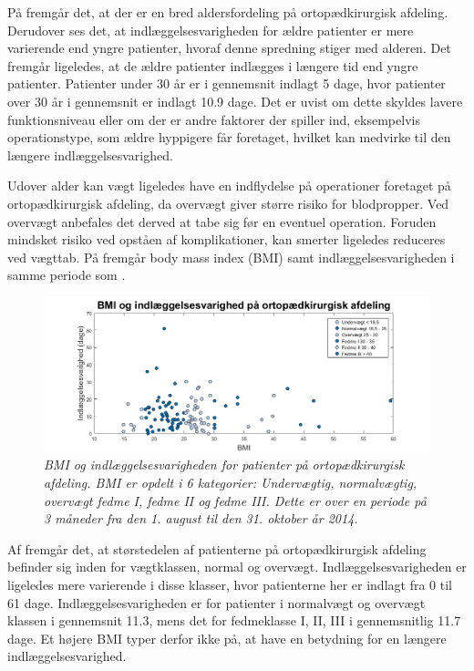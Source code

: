 \noindent
På  fremgår det, at der er en bred aldersfordeling på ortopædkirurgisk afdeling. Derudover ses det, at indlæggelsesvarigheden for ældre patienter er mere varierende end yngre patienter, hvoraf denne spredning stiger med alderen. Det fremgår ligeledes, at de ældre patienter indlægges i længere tid end yngre patienter. Patienter under $30$ år er i gennemsnit indlagt 5 dage, hvor patienter over $30$ år i gennemsnit er indlagt 10.9 dage. Det er uvist om dette skyldes lavere funktionsniveau eller om der er andre faktorer der spiller ind, eksempelvis operationstype, som ældre hyppigere får foretaget, hvilket kan medvirke til den længere indlæggelsesvarighed.


Udover alder kan vægt ligeledes have en indflydelse på operationer foretaget på ortopædkirurgisk afdeling, da overvægt giver større risiko for blodpropper\cite{Ermonds2004}. Ved overvægt anbefales det derved at tabe sig før en eventuel operation. Foruden mindsket risiko ved opståen af komplikationer, kan smerter ligeledes reduceres ved vægttab.\cite{Nordjylland2014} På  fremgår body mass index (BMI) samt indlæggelsesvarigheden i samme periode som .

\begin{figure}[H]
	\centering
	\includegraphics[scale=0.6]{figures/BMIogindlaeg}
	\caption{\textit{BMI og indlæggelsesvarigheden for patienter på ortopædkirurgisk afdeling. BMI er opdelt i 6 kategorier: Undervægtig, normalvægtig, overvægt fedme I, fedme II og fedme III. Dette er over en periode på 3 måneder fra den 1. august til den 31. oktober år 2014.}}
	\label{BMIogindlaeggelse}
\end{figure}


\noindent
Af  fremgår det, at størstedelen af patienterne på ortopædkirurgisk afdeling befinder sig inden for vægtklassen, normal og overvægt. Indlæggelsesvarigheden er ligeledes mere varierende i disse klasser, hvor patienterne her er indlagt fra 0 til 61 dage. Indlæggelsesvarigheden er for patienter i normalvægt og overvægt klassen i gennemsnit 11.3, mens det for fedmeklasse I, II, III i gennemsnitlig 11.7 dage. Et højere BMI typer derfor ikke på, at have en betydning for en længere indlæggelsesvarighed. 


